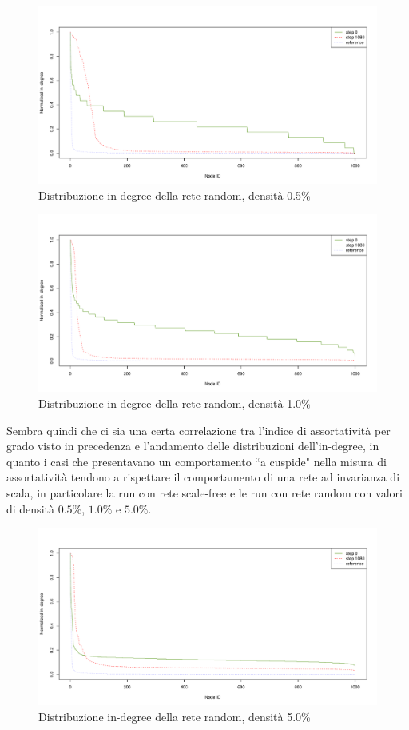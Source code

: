 \documentclass[a4paper,12pt]{article}
\begin{document}
\begin{figure}[H]
\centering
\includegraphics[scale=0.5]{images/dist_1000_rnd_1080_05_0.pdf}
\caption{Distribuzione in-degree della rete random, densità 0.5\%}
\label{fig:rndd05}
\end{figure}
\begin{figure}[h]
\centering
\includegraphics[scale=0.5]{images/dist_1000_rnd_1080_1_0.pdf}
\caption{Distribuzione in-degree della rete random, densità 1.0\%}
\label{fig:rndd1}
\end{figure}
Sembra quindi che ci sia una certa correlazione tra l'indice di assortatività per grado visto in precedenza e l'andamento delle distribuzioni dell'in-degree, in quanto i casi che presentavano un comportamento ``a cuspide" nella misura di assortatività tendono a rispettare il comportamento di una rete ad invarianza di scala, in particolare la run con rete scale-free e le run con rete random con valori di densità $0.5\%$, $1.0\%$ e $5.0\%$. 
\begin{figure}[H]
\centering
\includegraphics[scale=0.5]{images/dist_1000_rnd_1080_5_0.pdf}
\caption{Distribuzione in-degree della rete random, densità 5.0\%}
\label{fig:rndd5}
\end{figure}
\end{document}
